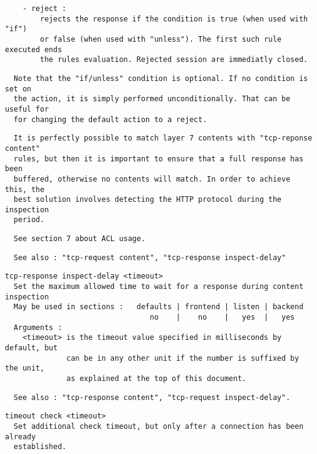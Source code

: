 \begin{verbatim}
    - reject :
        rejects the response if the condition is true (when used with "if")
        or false (when used with "unless"). The first such rule executed ends
        the rules evaluation. Rejected session are immediatly closed.
\end{verbatim}

\begin{verbatim}
  Note that the "if/unless" condition is optional. If no condition is set on
  the action, it is simply performed unconditionally. That can be useful for
  for changing the default action to a reject.
\end{verbatim}

\begin{verbatim}
  It is perfectly possible to match layer 7 contents with "tcp-reponse content"
  rules, but then it is important to ensure that a full response has been
  buffered, otherwise no contents will match. In order to achieve this, the
  best solution involves detecting the HTTP protocol during the inspection
  period.
\end{verbatim}

\begin{verbatim}
  See section 7 about ACL usage.
\end{verbatim}

\begin{verbatim}
  See also : "tcp-request content", "tcp-response inspect-delay"
\end{verbatim}

\begin{verbatim}
tcp-response inspect-delay <timeout>
  Set the maximum allowed time to wait for a response during content inspection
  May be used in sections :   defaults | frontend | listen | backend
                                 no    |    no    |   yes  |   yes
  Arguments :
    <timeout> is the timeout value specified in milliseconds by default, but
              can be in any other unit if the number is suffixed by the unit,
              as explained at the top of this document.
\end{verbatim}

\begin{verbatim}
  See also : "tcp-response content", "tcp-request inspect-delay".
\end{verbatim}

\begin{verbatim}
timeout check <timeout>
  Set additional check timeout, but only after a connection has been already
  established.
\end{verbatim}

